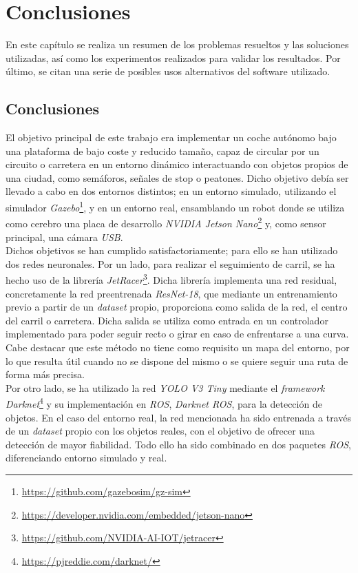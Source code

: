 \chapter{Conclusiones}
\label{cap:capitulo5}
En este capítulo se realiza un resumen de los problemas resueltos y las soluciones utilizadas, así como los experimentos realizados para validar los resultados. Por último, se citan una serie de posibles usos alternativos del software utilizado.

\section{Conclusiones}
\label{section:conclusiones}
El objetivo principal de este trabajo era implementar un coche autónomo bajo una plataforma de bajo coste y reducido tamaño, capaz de circular por un circuito o carretera en un entorno dinámico interactuando con objetos propios de una ciudad, como semáforos, señales de stop o peatones. Dicho objetivo debía ser llevado a cabo en dos entornos distintos; en un entorno simulado, utilizando el simulador \textit{Gazebo}\footnote{\url{https://github.com/gazebosim/gz-sim}}, y en un entorno real, ensamblando un robot donde se utiliza como cerebro una placa de desarrollo \textit{NVIDIA Jetson Nano}\footnote{\url{https://developer.nvidia.com/embedded/jetson-nano}} y, como sensor principal, una cámara \textit{USB}.\\

Dichos objetivos se han cumplido satisfactoriamente; para ello se han utilizado dos redes neuronales. Por un lado, para realizar el seguimiento de carril, se ha hecho uso de la librería \textit{JetRacer}\footnote{\url{https://github.com/NVIDIA-AI-IOT/jetracer}}. Dicha librería implementa una red residual, concretamente la red preentrenada \textit{ResNet-18}, que mediante un entrenamiento previo a partir de un \textit{dataset} propio, proporciona como salida de la red, el centro del carril o carretera. Dicha salida se utiliza como entrada en un controlador implementado para poder seguir recto o girar en caso de enfrentarse a una curva. Cabe destacar que este método no tiene como requisito un mapa del entorno, por lo que resulta útil cuando no se dispone del mismo o se quiere seguir una ruta de forma más precisa.\\

Por otro lado, se ha utilizado la red \textit{YOLO V3 Tiny} mediante el \textit{framework} \textit{Darknet}\footnote{\url{https://pjreddie.com/darknet/}} y su implementación en \textit{ROS}, \textit{Darknet ROS}, para la detección de objetos. En el caso del entorno real, la red mencionada ha sido entrenada a través de un \textit{dataset} propio con los objetos reales, con el objetivo de ofrecer una detección de mayor fiabilidad. 
Todo ello ha sido combinado en dos paquetes \textit{ROS}, diferenciando entorno simulado y real.\\

